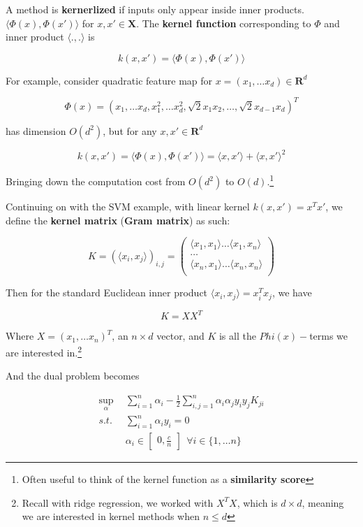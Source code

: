 \documentclass{article}
\DeclareMathOperator*{\msup}{sup}
\begin{document}
A method is \textbf{kernerlized} if inputs only appear inside inner products. $\langle \Phi(x) , \Phi(x') \rangle$ for $x, x' \in \mathbf{X}$.
The \textbf{kernel function} corresponding to $\Phi$ and inner product $\langle . , . \rangle$ is

$$
k(x, x') = \langle \Phi(x) , \Phi(x') \rangle
$$

For example, consider quadratic feature map for $x = (x_1, \dots x_d) \in \mathbf{R}^d$

$$
\Phi(x) = (x_1, \dots x_d, x_1^2, \dots x_d^2, \sqrt{2} x_1 x_2, \dots, \sqrt{2} x_{d - 1} x_d)^T
$$

has dimension $O(d^2)$, but for any $x, x' \in \mathbf{R}^d$

$$
k(x, x') = \langle \Phi(x), \Phi(x') \rangle = \langle x, x' \rangle + \langle x, x' \rangle^2
$$

Bringing down the computation cost from $O(d^2)$ to $O(d)$.\footnote{Often useful to think of the kernel function as a \textbf{similarity score}}

Continuing on with the SVM example, with linear kernel $k(x, x') = x^T x'$, we define the \textbf{kernel matrix} (\textbf{Gram matrix}) as such:

$$
K = (\langle x_i, x_j \rangle)_{i, j} =
\begin{pmatrix}
\langle x_1, x_1 \rangle \dots \langle x_1, x_n \rangle \\
\dots \\
\langle x_n, x_1 \rangle \dots \langle x_n, x_n \rangle \\
\end{pmatrix}
$$

Then for the standard Euclidean inner product $\langle x_i, x_j \rangle = x_i^T x_j$, we have

$$
K = X X^T
$$

Where $X = (x_1, \dots x_n)^T$, an $n \times d$ vector, and $K$ is all the $Phi(x)-$terms we are interested in.\footnote{Recall with ridge regression, we worked with $X^T X$, which is $d \times d$, meaning we are interested in kernel methods when $n \leq d$}

And the dual problem becomes

\begin{align*}
\msup_{\alpha} ~ ~ & \sum_{i = 1}^{n}{\alpha_i} - \frac{1}{2} \sum_{i,j = 1}^{n}{\alpha_i \alpha_j y_i y_j K_{ji}} \\
s.t.               & \sum_{i = 1}^{n}{\alpha_i y_i} = 0 \\
                   & \alpha_i \in \begin{bmatrix}0, \frac{c}{n}\end{bmatrix} ~ ~ \forall i \in \{1, \dots n\}
\end{align*}
\end{document}
